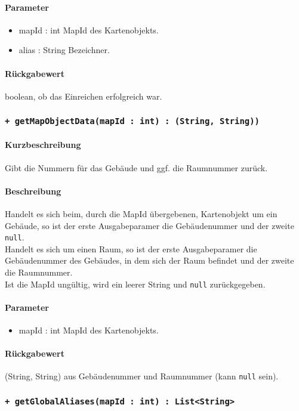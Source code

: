 \paragraph*{Parameter}
\begin{itemize}
    \item mapId : int MapId des Kartenobjekts.
    \item alias : String Bezeichner.
\end{itemize}
\paragraph*{Rückgabewert}
boolean, ob das Einreichen erfolgreich war.

\subsubsection*{\texttt{+ getMapObjectData(mapId : int) : (String, String))}}%
\paragraph*{Kurzbeschreibung}
Gibt die Nummern für das Gebäude und ggf. die Raumnummer zurück.
\paragraph*{Beschreibung}
Handelt es sich beim, durch die MapId übergebenen, Kartenobjekt um ein Gebäude, 
so ist der erste Ausgabeparamer die Gebäudenummer und der zweite \texttt{null}.\\
Handelt es sich um einen Raum, so ist der erste Ausgabeparamer die Gebäudenummer des Gebäudes, 
in dem sich der Raum befindet und der zweite die Raumnummer.\\
Ist die MapId ungültig, wird ein leerer String und \texttt{null} zurückgegeben.
\paragraph*{Parameter}
\begin{itemize}
    \item mapId : int MapId des Kartenobjekts.
\end{itemize}
\paragraph*{Rückgabewert}
(String, String) aus Gebäudenummer und Raumnummer (kann \texttt{null} sein).

\subsubsection*{\texttt{+ getGlobalAliases(mapId : int) : List<String>}}%
